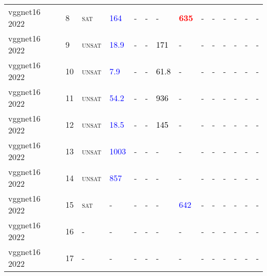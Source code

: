 \begin{center}
{\begin{longtable}{@{}llllllllllllll@{}}
vggnet16 2022 & 8 & \textsc{sat} & \textcolor{blue}{164} & - & - & - & \textbf{\textcolor{red}{635}} & - & - & - & - & - & - \\
vggnet16 2022 & 9 & \textsc{unsat} & \textcolor{blue}{18.9} & - & - & \textcolor{black}{171} & - & - & - & - & - & - & - \\
vggnet16 2022 & 10 & \textsc{unsat} & \textcolor{blue}{7.9} & - & - & \textcolor{black}{61.8} & - & - & - & - & - & - & - \\
vggnet16 2022 & 11 & \textsc{unsat} & \textcolor{blue}{54.2} & - & - & \textcolor{black}{936} & - & - & - & - & - & - & - \\
vggnet16 2022 & 12 & \textsc{unsat} & \textcolor{blue}{18.5} & - & - & \textcolor{black}{145} & - & - & - & - & - & - & - \\
vggnet16 2022 & 13 & \textsc{unsat} & \textcolor{blue}{1003} & - & - & - & - & - & - & - & - & - & - \\
vggnet16 2022 & 14 & \textsc{unsat} & \textcolor{blue}{857} & - & - & - & - & - & - & - & - & - & - \\
vggnet16 2022 & 15 & \textsc{sat} & - & - & - & - & \textcolor{blue}{642} & - & - & - & - & - & - \\
vggnet16 2022 & 16 & - & - & - & - & - & - & - & - & - & - & - & - \\
vggnet16 2022 & 17 & - & - & - & - & - & - & - & - & - & - & - & - \\
\bottomrule
\end{longtable}
}
\end{center}


